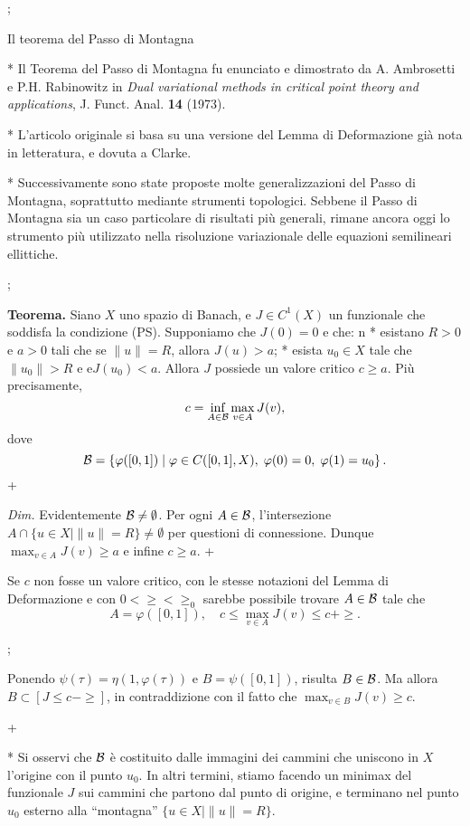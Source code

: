\pg;

\sec Il teorema del Passo di Montagna

* Il Teorema del Passo di Montagna fu enunciato e dimostrato da A. Ambrosetti e P.H. Rabinowitz in {\em Dual variational methods in critical point theory and applications}, J. Funct. Anal. {\bf 14} (1973).

* L'articolo originale si basa su una versione del Lemma di Deformazione gi\`a nota in letteratura, e dovuta a Clarke.

* Successivamente sono state proposte molte generalizzazioni del Passo di Montagna, soprattutto mediante strumenti topologici. Sebbene il Passo di Montagna sia un caso particolare di risultati pi\`u generali, rimane ancora oggi lo strumento pi\`u utilizzato nella risoluzione variazionale delle equazioni semilineari ellittiche.

\pg;

{\bf Teorema.} Siano $X$ uno spazio di Banach, e $J \in C^1(X)$ un funzionale che soddisfa la condizione (PS). Supponiamo che $J(0)=0$ e che:
\begitems
\style n
* esistano $R>0$ e $a>0$ tali che se $\|u\|=R$, allora $J(u) > a$;
* esista $u_0 \in X$ tale che $\|u_0\|>R$ e e$J(u_0)<a$.
\enditems
Allora $J$ possiede un valore critico $c\geq a$. Pi\`u precisamente,
$$
c = \inf_{A \in {\cal B}} \max_{v \in A} J(v),
$$
dove
$$
{\cal B} = \left\{ \varphi([0,1]) \mid \varphi \in C([0,1],X),\; \varphi(0)=0,\; \varphi(1)=u_0 \right\}.
$$
\pg+

{\em Dim.} Evidentemente ${\cal B} \neq \emptyset$.  Per ogni $A \in
{\cal B}$, l'intersezione $A \cap \{u \in X \mid \|u\|=R\} \neq
\emptyset$ per questioni di connessione. Dunque $\max_{v \in A} J(v)
\geq a$ e infine $c \geq a$.  \pg+

Se $c$ non fosse un valore critico, con le stesse notazioni del Lemma
di Deformazione e con $0<\ge < \ge_0$ sarebbe possibile trovare $A \in
{\cal B}$ tale che
$$
A = \varphi([0,1]), \quad c \leq \max_{v \in A} J(v) \leq c+\ge.
$$

\pg;

Ponendo $\psi(\tau) = \eta(1,\varphi(\tau))$ e $B = \psi([0,1])$,
risulta $B \in {\cal B}$. Ma allora $B \subset [J \leq c-\ge]$, in
contraddizione con il fatto che $\max_{v \in B} J(v) \geq c$.

\pg+

* Si osservi che ${\cal B}$ \`e costituito dalle immagini dei cammini
  che uniscono in $X$ l'origine con il punto $u_0$. In altri termini,
  stiamo facendo un minimax del funzionale $J$ sui cammini che partono
  dal punto di origine, e terminano nel punto $u_0$ esterno alla
  ``montagna'' $\{u \in X \mid \|u\|=R\}$.

